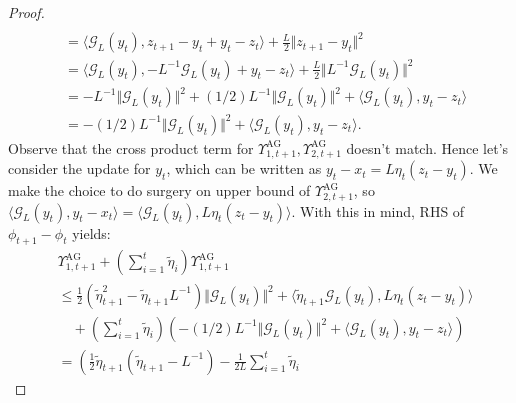 \documentclass[12pt]{article}
\begin{document}
\begin{proof}
\begin{align*}
            \\
            &= 
            \langle \mathcal G_L(y_t), z_{t + 1} - y_t + y_t - z_t\rangle
            + \frac{L}{2}\Vert z_{t + 1} - y_t\Vert^2
            \\
            &= 
            \langle \mathcal G_L(y_t), - L^{-1} \mathcal G_L(y_t) + y_t - z_t\rangle
            + 
            \frac{L}{2}\Vert L^{-1}\mathcal G_L(y_t)\Vert^2
            \\
            &= 
            -L^{-1}\Vert \mathcal G_L(y_t)\Vert^2 
            + 
            (1/2)L^{-1}\Vert \mathcal G_L(y_t)\Vert^2 
            + 
            \langle \mathcal G_L(y_t), y_t - z_t\rangle
            \\
            &= 
            -(1/2)L^{-1}\Vert \mathcal G_L(y_t)\Vert^2
            + 
            \langle \mathcal G_L(y_t), y_t - z_t\rangle. 
        \end{align*}
        Observe that the cross product term for $\Upsilon_{1, t + 1}^\text{AG}, \Upsilon_{2, t + 1}^\text{AG}$ doesn't match. 
        Hence let's consider the update for $y_t$, which can be written as $y_t - x_t = L \eta_t (z_t - y_t)$. We make the choice to do surgery on upper bound of $\Upsilon_{2, t + 1}^\text{AG}$, so $\langle \mathcal G_L(y_t), y_t - x_t\rangle = \langle \mathcal G_L(y_t), L \eta_t (z_t - y_t)\rangle$. 
        With this in mind, RHS of $\phi_{t + 1} - \phi_t$ yields: 
        {\footnotesize
        \begin{align*}
            &\Upsilon_{1, t + 1}^\text{AG} + 
            \left(
                \sum_{i = 1}^{t}\tilde\eta_i 
            \right)\Upsilon_{1, t + 1}^{\text{AG}}
            \\
            &\le 
            \frac{1}{2}\left(
                \tilde\eta_{t + 1}^2 - \tilde\eta_{t + 1}L^{-1}
            \right)\Vert \mathcal G_L(y_t)\Vert^2 
            + 
            \langle \tilde\eta_{t + 1} \mathcal G_L(y_t), L\eta_t(z_t - y_t)\rangle
            \\ 
            &\quad 
            + 
            \left(
                \sum_{i = 1}^{t}\tilde\eta_i 
            \right)\left(
                -(1/2)L^{-1}\Vert \mathcal G_L(y_t)\Vert^2
                + 
                \langle \mathcal G_L(y_t), y_t - z_t\rangle
            \right)
            \\
            &= 
            \left(
                \frac{1}{2}\tilde\eta_{t + 1}\left(
                    \tilde \eta_{t +1} - L^{-1}
                \right)
                - 
                \frac{1}{2L}\sum_{i = 1}^{t}\tilde \eta_i

\end{align*}}
\end{proof}
\end{document}
